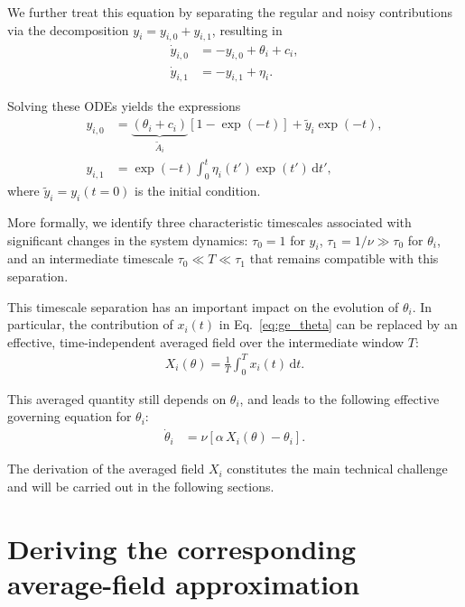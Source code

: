 \documentclass[reprint,amsmath,amssymb,aps]{revtex4-2}
\begin{document}
We further treat this equation by separating the regular and noisy contributions via the decomposition $y_i = y_{i,0} + y_{i,1}$, resulting in
\begin{align}
    \label{eq:atomic_0}
    \dot{y}_{i,0} &= -y_{i,0} + \theta_i + c_i ,\\
    \label{eq:atomic_1}
    \dot{y}_{i,1} &= -y_{i,1} + \eta_i .
\end{align}

Solving these ODEs yields the expressions
\begin{align*}
    y_{i,0} &= \underbrace{\left(\theta_i + c_i\right)}_{\tilde{A}_i}\!\left[1 - \exp\left(-t\right)\right] + \tilde{y}_i \exp(-t) , \\
    y_{i,1} &= \exp(-t) \int_0^t \eta_i(t') \exp(t') \,\mathrm{d}t' ,
\end{align*}
where $\tilde{y}_i = y_i(t=0)$ is the initial condition.

More formally, we identify three characteristic timescales associated with significant changes in the system dynamics: $\tau_0 = 1$ for $y_i$, $\tau_1 = 1/\nu \gg \tau_0$ for $\theta_i$, and an intermediate timescale $\tau_0 \ll T \ll \tau_1$ that remains compatible with this separation.

This timescale separation has an important impact on the evolution of $\theta_i$. In particular, the contribution of $x_i(t)$ in Eq.~\eqref{eq:ge_theta} can be replaced by an effective, time-independent averaged field over the intermediate window $T$:
\begin{align}
    X_i(\theta) = \frac{1}{T} \int_0^T x_i(t)\,\mathrm{d}t.
    \label{eq:xdynamics}
\end{align}

This averaged quantity still depends on $\theta_i$, and leads to the following effective governing equation for $\theta_i$:
\begin{align}
    \dot{\theta}_i &= \nu \left[ \alpha\, X_i(\theta) - \theta_i \right].
    \label{eq:thetadynamics}
\end{align}

The derivation of the averaged field $X_i$ constitutes the main technical challenge and will be carried out in the following sections.

\section{Deriving the corresponding average-field approximation}%
\label{averagefield}
\end{document}
